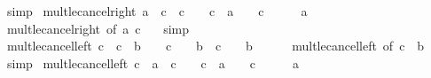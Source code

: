 \begin{isabellebody}
\ simp%
\endisatagproof
{\isafoldproof}%
%
\isadelimproof
\isanewline
%
\endisadelimproof
\isanewline
{}\isamarkupfalse%
\ mult{\isacharunderscore}{\kern0pt}le{\isacharunderscore}{\kern0pt}cancel{\isacharunderscore}{\kern0pt}right{}{\isacharcolon}{\kern0pt}\ {\isachardoublequoteopen}a\ {\isacharasterisk}{\kern0pt}\ c\ {\isasymle}\ c\ {\isasymlongleftrightarrow}\ {\isacharparenleft}{\kern0pt}{}\ {\isacharless}{\kern0pt}\ c\ {\isasymlongrightarrow}\ a\ {\isasymle}\ {}{\isacharparenright}{\kern0pt}\ {\isasymand}\ {\isacharparenleft}{\kern0pt}c\ {\isacharless}{\kern0pt}\ {}\ {\isasymlongrightarrow}\ {}\ {\isasymle}\ a{\isacharparenright}{\kern0pt}{\isachardoublequoteclose}\isanewline
%
\isadelimproof
\ \ %
\endisadelimproof
%
\isatagproof
{}\isamarkupfalse%
\ mult{\isacharunderscore}{\kern0pt}le{\isacharunderscore}{\kern0pt}cancel{\isacharunderscore}{\kern0pt}right\ {\isacharbrackleft}{\kern0pt}of\ a\ c\ {}{\isacharbrackright}{\kern0pt}\ \isamarkupfalse%
\ simp%
\endisatagproof
{\isafoldproof}%
%
\isadelimproof
\isanewline
%
\endisadelimproof
\isanewline
{}\isamarkupfalse%
\ mult{\isacharunderscore}{\kern0pt}le{\isacharunderscore}{\kern0pt}cancel{\isacharunderscore}{\kern0pt}left{}{\isacharcolon}{\kern0pt}\ {\isachardoublequoteopen}c\ {\isasymle}\ c\ {\isacharasterisk}{\kern0pt}\ b\ {\isasymlongleftrightarrow}\ {\isacharparenleft}{\kern0pt}{}\ {\isacharless}{\kern0pt}\ c\ {\isasymlongrightarrow}\ {}\ {\isasymle}\ b{\isacharparenright}{\kern0pt}\ {\isasymand}\ {\isacharparenleft}{\kern0pt}c\ {\isacharless}{\kern0pt}\ {}\ {\isasymlongrightarrow}\ b\ {\isasymle}\ {}{\isacharparenright}{\kern0pt}{\isachardoublequoteclose}\isanewline
%
\isadelimproof
\ \ %
\endisadelimproof
%
\isatagproof
{}\isamarkupfalse%
\ mult{\isacharunderscore}{\kern0pt}le{\isacharunderscore}{\kern0pt}cancel{\isacharunderscore}{\kern0pt}left\ {\isacharbrackleft}{\kern0pt}of\ c\ {}\ b{\isacharbrackright}{\kern0pt}\ \isamarkupfalse%
\ simp%
\endisatagproof
{\isafoldproof}%
%
\isadelimproof
\isanewline
%
\endisadelimproof
\isanewline
{}\isamarkupfalse%
\ mult{\isacharunderscore}{\kern0pt}le{\isacharunderscore}{\kern0pt}cancel{\isacharunderscore}{\kern0pt}left{}{\isacharcolon}{\kern0pt}\ {\isachardoublequoteopen}c\ {\isacharasterisk}{\kern0pt}\ a\ {\isasymle}\ c\ {\isasymlongleftrightarrow}\ {\isacharparenleft}{\kern0pt}{}\ {\isacharless}{\kern0pt}\ c\ {\isasymlongrightarrow}\ a\ {\isasymle}\ {}{\isacharparenright}{\kern0pt}\ {\isasymand}\ {\isacharparenleft}{\kern0pt}c\ {\isacharless}{\kern0pt}\ {}\ {\isasymlongrightarrow}\ {}\ {\isasymle}\ a{\isacharparenright}{\kern0pt}{\isachardoublequoteclose}\isanewline

\end{isabellebody}
